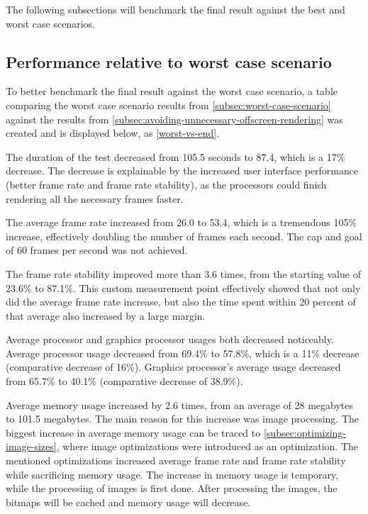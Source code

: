\documentclass[a4paper,12pt]{article}
\begin{document}
The following subsections will benchmark the final result against the best and worst case scenarios.

\subsection{Performance relative to worst case scenario}
\label{subsec:performance-relative-to-worst-case-scenario}
To better benchmark the final result against the worst case scenario, a table comparing the worst case scenario results from \autoref{subsec:worst-case-scenario} against the results from \autoref{subsec:avoiding-unnecessary-offscreen-rendering} was created and is displayed below, as \autoref{worst-vs-end}.

The duration of the test decreased from 105.5 seconds to 87.4, which is a 17\% decrease. The decrease is explainable by the increased user interface performance (better frame rate and frame rate stability), as the processors could finish rendering all the necessary frames faster.

The average frame rate increased from 26.0 to 53.4, which is a tremendous 105\% increase, effectively doubling the number of frames each second. The cap and goal of 60 frames per second was not achieved.

The frame rate stability improved more than 3.6 times, from the starting value of 23.6\% to 87.1\%. This custom measurement point effectively showed that not only did the average frame rate increase, but also the time spent within 20 percent of that average also increased by a large margin.

Average processor and graphics processor usages both decreased noticeably. Average processor usage decreased from 69.4\% to 57.8\%, which is a 11\% decrease (comparative decrease of 16\%). Graphics processor's average usage decreased from 65.7\% to 40.1\% (comparative decrease of 38.9\%).

Average memory usage increased by 2.6 times, from an average of 28 megabytes to 101.5 megabytes. The main reason for this increase was image processing. The biggest increase in average memory usage can be traced to \autoref{subsec:optimizing-image-sizes}, where image optimizations were introduced as an optimization. The mentioned optimizations increased average frame rate and frame rate stability while sacrificing memory usage. The increase in memory usage is temporary, while the processing of images is first done. After processing the images, the bitmaps will be cached and memory usage will decrease.
\end{document}
